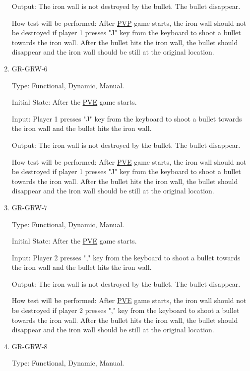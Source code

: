 \documentclass[12pt, titlepage]{article}
\begin{document}
\begin{enumerate}
Output: The iron wall is not destroyed by the bullet. The bullet disappear.
					
How test will be performed: After \underline{PVP} game starts, the iron wall should not be destroyed if player 1 presses "J" key from the keyboard to shoot a bullet towards the iron wall. After the bullet hits the iron wall, the bullet should disappear and the iron wall should be still at the original location.

\item{GR-GRW-6\\}

Type: Functional, Dynamic, Manual.
					
Initial State: After the \underline{PVE} game starts. 
					
Input: Player 1 presses "J" key from the keyboard to shoot a bullet towards the iron wall and the bullet hits the iron wall.
					
Output: The iron wall is not destroyed by the bullet. The bullet disappear.
					
How test will be performed: After \underline{PVE} game starts, the iron wall should not be destroyed if player 1 presses "J" key from the keyboard to shoot a bullet towards the iron wall. After the bullet hits the iron wall, the bullet should disappear and the iron wall should be still at the original location.

\item{GR-GRW-7\\}

Type: Functional, Dynamic, Manual.
					
Initial State: After the \underline{PVE} game starts. 
					
Input: Player 2 presses "," key from the keyboard to shoot a bullet towards the iron wall and the bullet hits the iron wall.
					
Output: The iron wall is not destroyed by the bullet. The bullet disappear.
					
How test will be performed: After \underline{PVE} game starts, the iron wall should not be destroyed if player 2 presses "," key from the keyboard to shoot a bullet towards the iron wall. After the bullet hits the iron wall, the bullet should disappear and the iron wall should be still at the original location.

\item{GR-GRW-8\\}

Type: Functional, Dynamic, Manual.
					

\end{enumerate}
\end{document}

